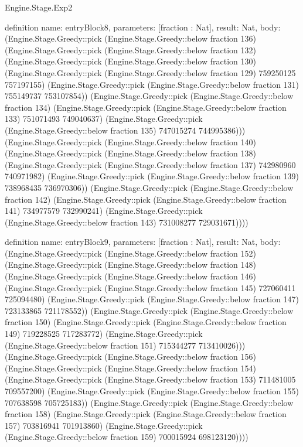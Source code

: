 \begin{lexlean}{Engine.Stage.Exp2}
\begin{semanticmodule}
definition{
  name: entryBlock8,
  parameters: [fraction : Nat],
  result: Nat,
  body: (Engine.Stage.Greedy::pick (Engine.Stage.Greedy::below fraction 136) (Engine.Stage.Greedy::pick (Engine.Stage.Greedy::below fraction 132) (Engine.Stage.Greedy::pick (Engine.Stage.Greedy::below fraction 130) (Engine.Stage.Greedy::pick (Engine.Stage.Greedy::below fraction 129) 759250125 757197155) (Engine.Stage.Greedy::pick (Engine.Stage.Greedy::below fraction 131) 755149737 753107854)) (Engine.Stage.Greedy::pick (Engine.Stage.Greedy::below fraction 134) (Engine.Stage.Greedy::pick (Engine.Stage.Greedy::below fraction 133) 751071493 749040637) (Engine.Stage.Greedy::pick (Engine.Stage.Greedy::below fraction 135) 747015274 744995386))) (Engine.Stage.Greedy::pick (Engine.Stage.Greedy::below fraction 140) (Engine.Stage.Greedy::pick (Engine.Stage.Greedy::below fraction 138) (Engine.Stage.Greedy::pick (Engine.Stage.Greedy::below fraction 137) 742980960 740971982) (Engine.Stage.Greedy::pick (Engine.Stage.Greedy::below fraction 139) 738968435 736970306)) (Engine.Stage.Greedy::pick (Engine.Stage.Greedy::below fraction 142) (Engine.Stage.Greedy::pick (Engine.Stage.Greedy::below fraction 141) 734977579 732990241) (Engine.Stage.Greedy::pick (Engine.Stage.Greedy::below fraction 143) 731008277 729031671))))
}

definition{
  name: entryBlock9,
  parameters: [fraction : Nat],
  result: Nat,
  body: (Engine.Stage.Greedy::pick (Engine.Stage.Greedy::below fraction 152) (Engine.Stage.Greedy::pick (Engine.Stage.Greedy::below fraction 148) (Engine.Stage.Greedy::pick (Engine.Stage.Greedy::below fraction 146) (Engine.Stage.Greedy::pick (Engine.Stage.Greedy::below fraction 145) 727060411 725094480) (Engine.Stage.Greedy::pick (Engine.Stage.Greedy::below fraction 147) 723133865 721178552)) (Engine.Stage.Greedy::pick (Engine.Stage.Greedy::below fraction 150) (Engine.Stage.Greedy::pick (Engine.Stage.Greedy::below fraction 149) 719228525 717283772) (Engine.Stage.Greedy::pick (Engine.Stage.Greedy::below fraction 151) 715344277 713410026))) (Engine.Stage.Greedy::pick (Engine.Stage.Greedy::below fraction 156) (Engine.Stage.Greedy::pick (Engine.Stage.Greedy::below fraction 154) (Engine.Stage.Greedy::pick (Engine.Stage.Greedy::below fraction 153) 711481005 709557200) (Engine.Stage.Greedy::pick (Engine.Stage.Greedy::below fraction 155) 707638598 705725183)) (Engine.Stage.Greedy::pick (Engine.Stage.Greedy::below fraction 158) (Engine.Stage.Greedy::pick (Engine.Stage.Greedy::below fraction 157) 703816941 701913860) (Engine.Stage.Greedy::pick (Engine.Stage.Greedy::below fraction 159) 700015924 698123120))))
}


\end{semanticmodule}
\end{lexlean}
